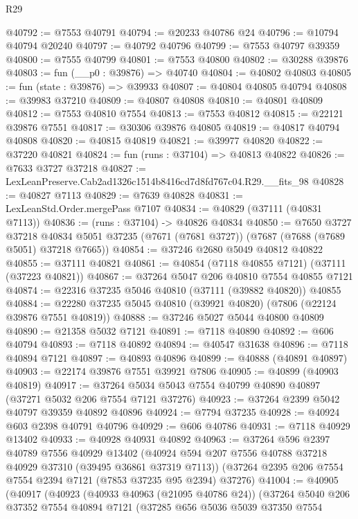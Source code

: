 \begin{lexlean}{R29}
\begin{coremodule}
@40792 := @7553 @40791
@40794 := @20233 @40786 @24
@40796 := @10794 @40794 @20240
@40797 := @40792 @40796
@40799 := @7553 @40797 @39359
@40800 := @7555 @40799
@40801 := @7553 @40800
@40802 := @30288 @39876
@40803 := fun (__p0 : @39876) => @40740
@40804 := @40802 @40803
@40805 := fun (state : @39876) => @39933
@40807 := @40804 @40805 @40794
@40808 := @39983 @37210
@40809 := @40807 @40808
@40810 := @40801 @40809
@40812 := @7553 @40810 @7554
@40813 := @7553 @40812
@40815 := @22121 @39876 @7551
@40817 := @30306 @39876 @40805
@40819 := @40817 @40794 @40808
@40820 := @40815 @40819
@40821 := @39977 @40820
@40822 := @37220 @40821
@40824 := fun (runs : @37104) => @40813 @40822
@40826 := @7633 @3727 @37218
@40827 := LexLeanPreserve.Cab2ad1326c1514b8416cd7d8fd767c04.R29.__fits_98
@40828 := @40827 @7113
@40829 := @7639 @40828
@40831 := LexLeanStd.Order.mergePass @7107
@40834 := @40829 (@37111 (@40831 @7113))
@40836 := (runs : @37104) -> @40826 @40834
@40850 := @7650
    @3727
    @37218
    @40834
    @5051
    @37235
    (@7671 (@7681 @3727))
    (@7687 (@7688 (@7689 @5051) @37218 @7665))
@40854 := @37246 @2680 @5049 @40812 @40822
@40855 := @37111 @40821
@40861 := @40854 (@7118 @40855 @7121) (@37111 (@37223 @40821))
@40867 := @37264 @5047 @206 @40810 @7554 @40855 @7121
@40874 := @22316 @37235 @5046 @40810 (@37111 (@39882 @40820)) @40855
@40884 := @22280 @37235 @5045 @40810 (@39921 @40820) (@7806 (@22124 @39876 @7551 @40819))
@40888 := @37246 @5027 @5044 @40800 @40809
@40890 := @21358 @5032 @7121
@40891 := @7118 @40890
@40892 := @606 @40794
@40893 := @7118 @40892
@40894 := @40547 @31638
@40896 := @7118 @40894 @7121
@40897 := @40893 @40896
@40899 := @40888 (@40891 @40897)
@40903 := @22174 @39876 @7551 @39921 @7806
@40905 := @40899 (@40903 @40819)
@40917 := @37264 @5034 @5043 @7554 @40799 @40890 @40897 (@37271 @5032 @206 @7554 @7121 @37276)
@40923 := @37264 @2399 @5042 @40797 @39359 @40892 @40896
@40924 := @7794 @37235
@40928 := @40924 @603 @2398 @40791 @40796
@40929 := @606 @40786
@40931 := @7118 @40929 @13402
@40933 := @40928 @40931 @40892
@40963 := @37264
    @596
    @2397
    @40789
    @7556
    @40929
    @13402
    (@40924 @594 @207 @7556 @40788 @37218 @40929 @37310 (@39495 @36861 @37319 @7113))
    (@37264 @2395 @206 @7554 @7554 @2394 @7121 (@7853 @37235 @95 @2394) @37276)
@41004 := @40905
    (@40917
      (@40923
        (@40933 @40963 (@21095 @40786 @24))
        (@37264
          @5040
          @206
          @37352
          @7554
          @40894
          @7121
          (@37285
            @656
            @5036
            @5039
            @37350
            @7554

\end{coremodule}
\end{lexlean}
